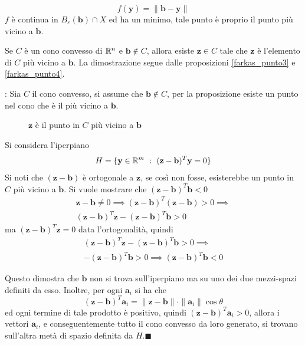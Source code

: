 \documentclass[10pt, letterpaper]{report}
\newcommand{\bb}{{\mathbf{b}}}
\newcommand{\y}{{\mathbf{y}}}
\begin{document}
$$ f(\y)=\|\bb-\y\|$$
$f$ è continua in $B_\varepsilon(\bb)\cap X$ ed ha un minimo, tale punto è proprio il punto più vicino a $\bb$.
\begin{proposizione}\label{farkas_punto5}
    Se $C$ è un cono convesso di ${\mathbb R}^n$ e $\bb\notin C$, allora esiste $\mathbf z\in C$ tale che $\mathbf z$ è l'elemento di $C$ più vicino a $\bb$. La dimostrazione segue dalle proposizioni \ref{farkas_punto3} e \ref{farkas_punto4}.
\end{proposizione}
: Sia $C$ il cono convesso, si assume che $\bb\notin C$, per la proposizione \label{farkas_punto5} esiste un punto nel cono che è il più vicino a $\bb$.

\begin{figure}[h]
    \caption{$\mathbf z$ è il punto in $C$ più vicino a $\bb$}
\end{figure}

Si considera l'iperpiano 
$$H=\{\y\in\R^m \ : \ (\mathbf z-\bb)^T\y=0\} $$
Si noti che $(\mathbf z-\bb)$ è ortogonale a $\mathbf z$, se così non fosse, esisterebbe un punto in $C$ più vicino a $\bb$. Si vuole mostrare che $(\mathbf z-\bb)^T\bb<0$\begin{eqnarray}
    \mathbf z - \bb \ne 0 \implies (\mathbf z - \bb)^T(\mathbf z - \bb)>0\implies \\ 
    (\mathbf z - \bb)^T\mathbf z - (\mathbf z - \bb)^T\bb >0
\end{eqnarray}
ma $(\mathbf z - \bb)^T\mathbf z =0$ data l'ortogonalità, quindi \begin{eqnarray}
    (\mathbf z - \bb)^T\mathbf z - (\mathbf z - \bb)^T\bb >0\implies\\ 
    - (\mathbf z - \bb)^T\bb >0\implies  (\mathbf z - \bb)^T\bb<0
\end{eqnarray}

Questo dimostra che $\bb$ non si trova sull'iperpiano ma su uno dei due mezzi-spazi definiti da esso. Inoltre, per ogni $\mathbf a_i$ si ha che 
$$ (\mathbf z -\bb)^T\mathbf a_i=\|\mathbf z -\bb\|\cdot \|\mathbf a_i\|\cos\theta$$
ed ogni termine di tale prodotto è positivo, quindi $ (\mathbf z -\bb)^T\mathbf a_i>0$, allora i vettori $\mathbf a_i$, e conseguentemente tutto il cono convesso da loro generato, si trovano sull'altra metà di spazio definita da $H$.\hfill$\blacksquare$
\end{document}
